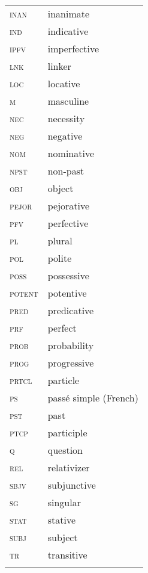\begin{tabularx}{.5\textwidth}{>{\scshape}lQ@{}} 
inan & inanimate\\
ind & indicative\\
ipfv & imperfective\\
lnk & linker\\
loc & locative\\
m & masculine\\
nec & necessity\\
neg & negative\\
nom & nominative\\
npst & non-past\\
obj & object\\
pejor & pejorative\\
pfv & perfective\\
pl & plural\\
pol & polite\\
poss & possessive\\
potent & potentive\\
pred & predicative\\
prf & perfect\\
prob & probability\\
prog & progressive\\
prtcl & particle\\
ps & passé simple (French)\\
pst & past\\
ptcp & participle\\
q & question\\
rel & relativizer\\
sbjv & subjunctive\\
sg & singular\\
stat & stative\\
subj & subject\\
tr & transitive\\
\\
\end{tabularx}
